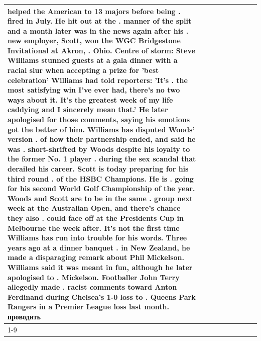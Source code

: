 \begin{table}[H]
\begin{tabular}{lllrlllll}
helped the American to 13 majors before being . fired in July. He hit out at the . manner of the split and a month later was in the news again after his . new employer, Scott, won the WGC Bridgestone Invitational at Akron, . Ohio. Centre of storm: Steve Williams stunned guests at a gala dinner with a racial slur when accepting a prize for 'best celebration' Williams had told reporters: 'It's . the most satisfying win I've ever had, there's no two ways about it. It's the greatest week of my life caddying and I sincerely mean that.' He later apologised for those comments, saying his emotions got the better of him. Williams has disputed Woods' version . of how their partnership ended, and said he was . short-shrifted by Woods despite his loyalty to the former No. 1 player . during the sex scandal that derailed his career. Scott is today preparing for his third round . of the HSBC Champions. He is . going for his second World Golf Championship of the year. Woods and Scott are to be in the same . group next week at the Australian Open, and there's chance they also . could face off at the Presidents Cup in Melbourne the week after. It's not the first time Williams has run into trouble for his words. Three years ago at a dinner banquet . in New Zealand, he made a disparaging remark about Phil Mickelson. Williams said it was meant in fun, although he later apologised to . Mickelson. Footballer John Terry allegedly made . racist comments toward Anton Ferdinand during Chelsea's 1-0 loss to . Queens Park Rangers in a Premier League loss last month. проводить \\
\cline{1-9}

\end{tabular}
\end{table}
